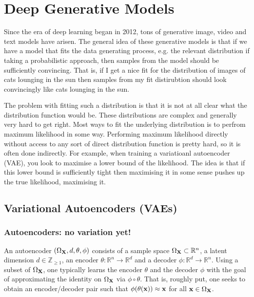 \documentclass[11pt]{article}
\begin{document}
\section{Deep Generative Models}

Since the era of deep learning began in 2012, tons of generative image, video and text models have arisen. The general idea of these generative models is that if we have a model that fits the data generating process, e.g. the relevant distribution if taking a probabilistic approach, then samples from the model should be sufficiently convincing. That is, if I get a nice fit for the distribution of images of cats lounging in the sun then samples from my fit distirubtion should look convincingly like cats lounging in the sun.

The problem with fitting such a distribution is that it is not at all clear what the distribution function would be. These distributions are complex and generally very hard to get right. Most ways to fit the underlying distribution is to perfrom maximum likelihood in some way. Performing maximum likelihood directly without access to any sort of direct distribution function is pretty hard, so it is often done indirectly. For example, when training a variatioanl autoencoder (VAE), you look to maximise a lower bound of the likelihood. The idea is that if this lower bound is sufficiently tight then maximising it in some sense pushes up the true likelihood, maximising it.

\subsection{Variational Autoencoders (VAEs)}

\subsubsection{Autoencoders: no variation yet!}
\label{sec:autoencoders}
An autoencoder $(\Omega_{\mathbf{X}},d,\theta,\phi)$ consists of a sample space $\Omega_{\mathbf{X}}\subset\mathbb{R}^n$, a latent dimension $d\in\mathbb{Z}_{\geq1}$, an encoder $\theta:\mathbb{R}^n\to\mathbb{R}^d$ and a decoder $\phi:\mathbb{R}^d\to\mathbb{R}^n$. Using a subset of $\Omega_{\mathbf{X}}$, one typically learns the encoder $\theta$ and the decoder $\phi$ with the goal of approximating the identity on $\Omega_{\mathbf{X}}$ via $\phi\circ \theta$. That is, roughly put, one seeks to obtain an encoder/decoder pair such that $\phi(\theta(\mathbf{x}))\approx\mathbf{x}$ for all $\mathbf{x}\in\Omega_{\mathbf{X}}$.
\end{document}
